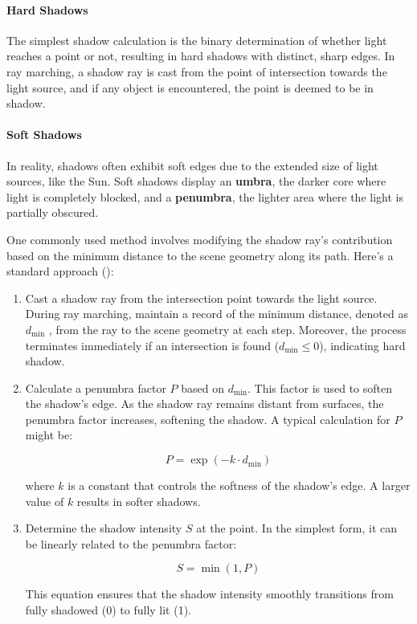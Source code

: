 \paragraph{Hard Shadows}
The simplest shadow calculation is the binary determination of whether light reaches a point or not, resulting in hard shadows with distinct, sharp edges. In ray marching, a shadow ray is cast from the point of intersection towards the light source, and if any object is encountered, the point is deemed to be in shadow.

\paragraph{Soft Shadows}
In reality, shadows often exhibit soft edges due to the extended size of light sources, like the Sun. Soft shadows display an \textbf{umbra}, the darker core where light is completely blocked, and a \textbf{penumbra}, the lighter area where the light is partially obscured.

One commonly used method involves modifying the shadow ray's contribution based on the minimum distance to the scene geometry along its path. Here's a standard approach ():

\begin{enumerate}
    \item Cast a shadow ray from the intersection point towards the light source. During ray marching, maintain a record of the minimum distance, denoted as $d_{\text{min}}$ , from the ray to the scene geometry at each step. Moreover, the process terminates immediately if an intersection is found ($d_{\text{min}}\le 0$), indicating hard shadow.

    \item Calculate a penumbra factor $P$ based on $d_{\text{min}}$. This factor is used to soften the shadow's edge. As the shadow ray remains distant from surfaces, the penumbra factor increases, softening the shadow. A typical calculation for $P$ might be:

    \begin{equation}
       P = \exp(-k \cdot d_{\text{min}})
    \end{equation}

    where $k$ is a constant that controls the softness of the shadow's edge. A larger value of $k$ results in softer shadows.

    \item Determine the shadow intensity $S$ at the point. In the simplest form, it can be linearly related to the penumbra factor:

    \begin{equation}
    S = \min(1, P)
    \end{equation}

    This equation ensures that the shadow intensity smoothly transitions from fully shadowed (0) to fully lit (1).
\end{enumerate}

